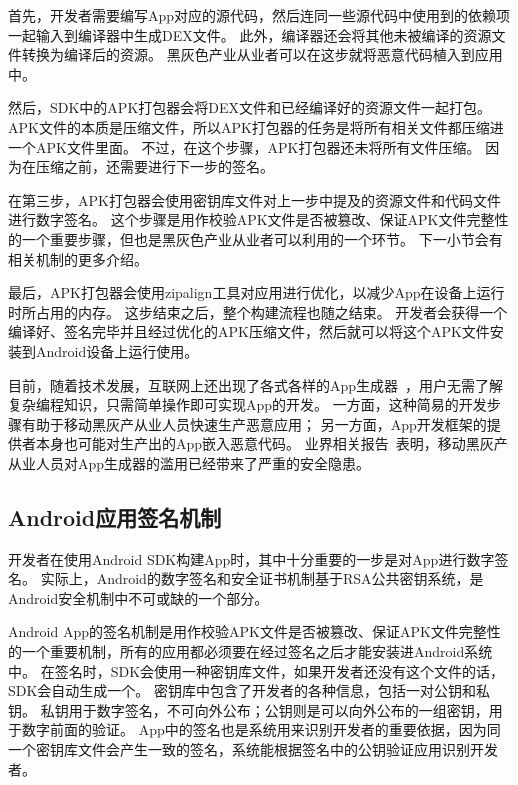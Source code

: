 首先，开发者需要编写App对应的源代码，然后连同一些源代码中使用到的依赖项一起输入到编译器中生成DEX文件。
此外，编译器还会将其他未被编译的资源文件转换为编译后的资源。
黑灰色产业从业者可以在这步就将恶意代码植入到应用中。

然后，SDK中的APK打包器会将DEX文件和已经编译好的资源文件一起打包。
APK文件的本质是压缩文件，所以APK打包器的任务是将所有相关文件都压缩进一个APK文件里面。
不过，在这个步骤，APK打包器还未将所有文件压缩。
因为在压缩之前，还需要进行下一步的签名。

在第三步，APK打包器会使用密钥库文件对上一步中提及的资源文件和代码文件进行数字签名。
这个步骤是用作校验APK文件是否被篡改、保证APK文件完整性的一个重要步骤，但也是黑灰色产业从业者可以利用的一个环节。
下一小节会有相关机制的更多介绍。

最后，APK打包器会使用zipalign工具对应用进行优化，以减少App在设备上运行时所占用的内存。
这步结束之后，整个构建流程也随之结束。
开发者会获得一个编译好、签名完毕并且经过优化的APK压缩文件，然后就可以将这个APK文件安装到Android设备上运行使用。

目前，随着技术发展，互联网上还出现了各式各样的App生成器~\cite{anjian, iApp}，用户无需了解复杂编程知识，只需简单操作即可实现App的开发。
一方面，这种简易的开发步骤有助于移动黑灰产从业人员快速生产恶意应用；
另一方面，App开发框架的提供者本身也可能对生产出的App嵌入恶意代码。
业界相关报告~\cite{anquanke_framework}表明，移动黑灰产从业人员对App生成器的滥用已经带来了严重的安全隐患。

\subsection{Android应用签名机制}

开发者在使用Android SDK构建App时，其中十分重要的一步是对App进行数字签名。
实际上，Android的数字签名和安全证书机制基于RSA公共密钥系统，是Android安全机制中不可或缺的一个部分。

Android App的签名机制是用作校验APK文件是否被篡改、保证APK文件完整性的一个重要机制，所有的应用都必须要在经过签名之后才能安装进Android系统中。
在签名时，SDK会使用一种密钥库文件，如果开发者还没有这个文件的话，SDK会自动生成一个。
密钥库中包含了开发者的各种信息，包括一对公钥和私钥。
私钥用于数字签名，不可向外公布；公钥则是可以向外公布的一组密钥，用于数字前面的验证。
App中的签名也是系统用来识别开发者的重要依据，因为同一个密钥库文件会产生一致的签名，系统能根据签名中的公钥验证应用识别开发者。


